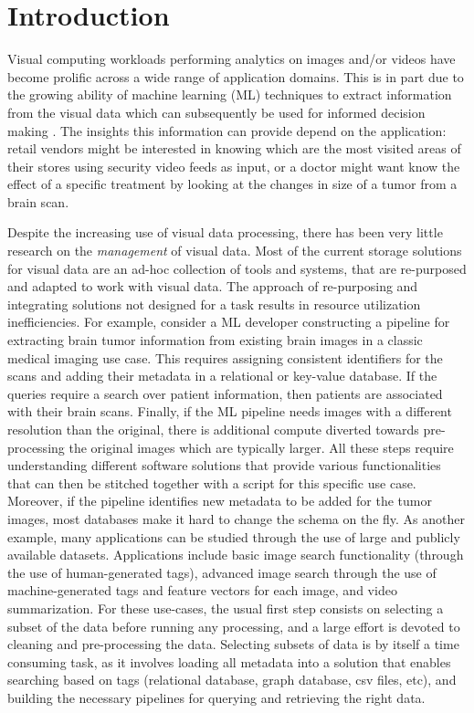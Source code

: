 \section{Introduction}
\label{intro}

Visual computing workloads performing analytics on images and/or videos
have become prolific across a wide range of application domains.
This is in part due to the growing ability of machine learning (ML) techniques
to extract information from the visual data which can subsequently be used
for informed decision making \cite{vdms-nips}.
The insights this information can provide depend on the
application: retail vendors might be interested in knowing which are the most
visited areas of their stores using security video feeds as input,
or a doctor might want know the effect of a specific treatment by
looking at the changes in size of a tumor from a brain scan.

Despite the increasing use of visual data processing,
there has been very little research on the \textit{management} of visual data.
Most of the current storage solutions for visual data are an ad-hoc collection
of tools and systems, that are re-purposed and adapted to work with visual data.
The approach of re-purposing and integrating solutions not designed for a task
results in resource utilization inefficiencies\cite{rasdaman}.
For example, consider a ML developer constructing a pipeline for extracting
brain tumor information from existing brain images in a classic medical
imaging use case.
This requires assigning consistent identifiers for the scans and adding their
metadata in a relational or key-value database\cite{kumar2017data}.
If the queries require a search over patient information,
then patients are associated with their brain scans.
Finally, if the ML pipeline needs images with a different resolution
than the original, there is additional compute
diverted towards pre-processing the original images which are typically larger.
All these steps require understanding different software
solutions that provide various functionalities that can then be stitched
together with a script for this specific use case.
Moreover, if the pipeline identifies new metadata to be added for
the tumor images, most databases make it hard to change the schema on the fly.
As another example, many applications can be studied through the use of large
and publicly available datasets.
Applications include basic image search functionality (through the use
of human-generated tags), advanced image search through the use of
machine-generated tags and feature vectors\cite{imagesearch, qin2020similarity}
for each image, and video summarization.
For these use-cases, the usual first step consists on selecting a
subset of the data before running any processing, and a large effort
is devoted to cleaning and pre-processing the data.
Selecting subsets of data is by itself a time consuming task,
as it involves loading all metadata into a solution that enables searching
based on tags (relational database, graph database, csv files, etc), and
building the necessary pipelines for querying and retrieving the right data.

